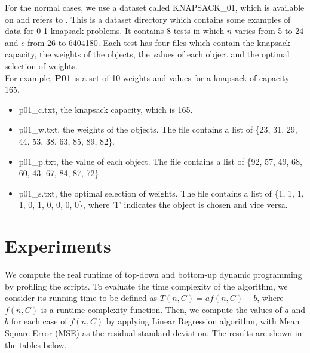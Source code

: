 \documentclass{article}
\begin{document}
For the normal cases, we use a dataset called KNAPSACK\_01, which is available on \cite{knapsack01} and refers to \cite{vance93}. This is a dataset directory which contains some examples of data for 0-1 knapsack problems. It contains 8 tests in which $n$ varies from 5 to 24 and $c$ from 26 to 6404180. Each test has four files which contain the knapsack capacity, the weights of the objects, the values of each object and the optimal selection of weights.\\

For example, \textbf{P01} is a set of 10 weights and values for a knapsack of capacity 165.
\begin{itemize}
    \item p01\_c.txt, the knapsack capacity, which is 165.
    \item p01\_w.txt, the weights of the objects. The file contains a list of \{23, 31, 29, 44, 53, 38, 63, 85, 89, 82\}.
    \item p01\_p.txt, the value of each object. The file contains a list of \{92, 57, 49, 68, 60, 43, 67, 84, 87, 72\}.
    \item p01\_s.txt, the optimal selection of weights. The file contains a list of \{1, 1, 1, 1, 0, 1, 0, 0, 0, 0\}, where '1' indicates the object is chosen and vice versa.
\end{itemize}

\section{Experiments}
We compute the real runtime of top-down and bottom-up dynamic programming by profiling the scripts. To evaluate the time complexity of the algorithm, we consider its running time to be defined as $T(n,C) = af(n,C) + b$, where $f(n,C)$ is a runtime complexity function. Then, we compute the values of $a$ and $b$ for each case of $f(n,C)$ by applying Linear Regression algorithm, with Mean Square Error (MSE) as the residual standard deviation. The results are shown in the tables below.\\
\end{document}

